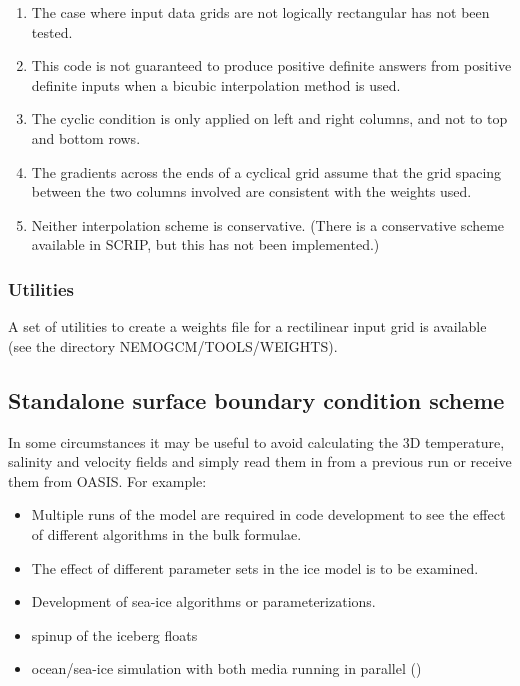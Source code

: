 \documentclass[../tex_main/NEMO_manual]{subfiles}
\begin{document}
\begin{enumerate}  
\item  The case where input data grids are not logically rectangular has not been tested.
\item  This code is not guaranteed to produce positive definite answers from positive definite inputs
          when a bicubic interpolation method is used.
\item  The cyclic condition is only applied on left and right columns, and not to top and bottom rows.
\item  The gradients across the ends of a cyclical grid assume that the grid spacing between 
          the two columns involved are consistent with the weights used.
\item  Neither interpolation scheme is conservative. (There is a conservative scheme available 
          in SCRIP, but this has not been implemented.)
\end{enumerate}

\subsubsection{Utilities}
\label{subsec:SBC_iof_util}

A set of utilities to create a weights file for a rectilinear input grid is available 
(see the directory NEMOGCM/TOOLS/WEIGHTS).

\subsection{Standalone surface boundary condition scheme}
\label{subsec:SAS_iof}


In some circumstances it may be useful to avoid calculating the 3D temperature, salinity and velocity fields 
and simply read them in from a previous run or receive them from OASIS.  
For example:

\begin{itemize}
\item  Multiple runs of the model are required in code development to see the effect of different algorithms in
       the bulk formulae.
\item  The effect of different parameter sets in the ice model is to be examined.
\item  Development of sea-ice algorithms or parameterizations.
\item  spinup of the iceberg floats
\item  ocean/sea-ice simulation with both media running in parallel ()
\end{itemize}
\end{document}
